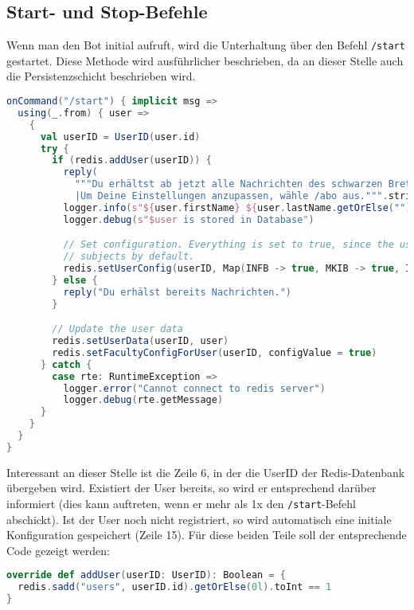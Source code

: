 \subsection{Start- und Stop-Befehle}\label{sec:StartStopCommands}
Wenn man den Bot initial aufruft, wird die Unterhaltung über den Befehl \texttt{/start} gestartet. Diese Methode wird ausführlicher beschrieben, da an dieser Stelle auch die Persistenzschicht beschrieben wird.

\begin{lstlisting}[language=scala, style=scala, caption=Reagieren auf Start-Befehl]
onCommand("/start") { implicit msg =>
  using(_.from) { user =>
    {
      val userID = UserID(user.id)
      try {
        if (redis.addUser(userID)) {
          reply(
            """Du erhältst ab jetzt alle Nachrichten des schwarzen Bretts und der Fakultät IWI an der HSKA.
            |Um Deine Einstellungen anzupassen, wähle /abo aus.""".stripMargin)
          logger.info(s"${user.firstName} ${user.lastName.getOrElse("")} added to subscriptions.")
          logger.debug(s"$user is stored in Database")

          // Set configuration. Everything is set to true, since the user subscribes to all
          // subjects by default.
          redis.setUserConfig(userID, Map(INFB -> true, MKIB -> true, INFM -> true))
        } else {
          reply("Du erhälst bereits Nachrichten.")
        }

        // Update the user data
        redis.setUserData(userID, user)
        redis.setFacultyConfigForUser(userID, configValue = true)
      } catch {
        case rte: RuntimeException =>
          logger.error("Cannot connect to redis server")
          logger.debug(rte.getMessage)
      }
    }
  }
}
\end{lstlisting}

Interessant an dieser Stelle ist die Zeile 6, in der die UserID der Redis-Datenbank übergeben wird. Existiert der User bereits, so wird er entsprechend darüber informiert (dies kann auftreten, wenn er mehr als 1x den \texttt{/start}-Befehl abschickt). Ist der User noch nicht registriert, so wird automatisch eine initiale Konfiguration gespeichert (Zeile 15). Für diese beiden Teile soll der entsprechende Code gezeigt werden:

\begin{lstlisting}[language=scala, style=scala, caption=Hinzufügen eines Users zur Datenbank]
override def addUser(userID: UserID): Boolean = {
  redis.sadd("users", userID.id).getOrElse(0l).toInt == 1
}
\end{lstlisting}

